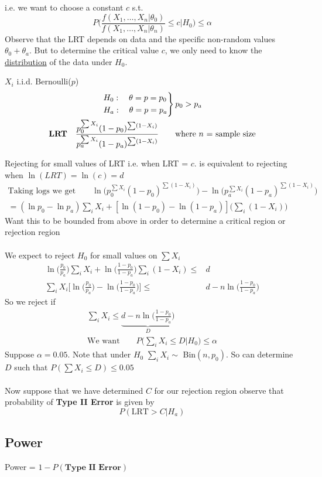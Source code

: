 i.e. we want to choose a constant $c$ s.t.
\begin{equation*}
	P\bigg( \frac{f(X_1, \ldots, X_n | \theta_0)}{f(X_1, \ldots, X_n | \theta_n)} \leq c \bigg| H_0 \bigg) \leq \alpha
\end{equation*}
Observe that the LRT depends on data and the specific non-random values $\theta_0 + \theta_a$. But to determine the critical value $c$, we only need to know the \underline{distribution} of the data under $H_0$.
\begin{example} $X_i$ i.i.d. Bernoulli($p$)
\begin{gather*}
\begin{rcases}
	H_0: \quad \theta = p = p_0\\
	H_a: \quad \theta = p = p_a
\end{rcases} p_0 > p_a\\
\textbf{LRT} \quad \frac{p_0^{\sum X_i} (1-p_0)^{\sum (1 - X_i)}}{p_a^{\sum X_i} (1-p_a)^{\sum (1- X_i)}} \qquad \text{where $n$ = sample size}
\end{gather*}	
\end{example}
Rejecting for small values of LRT i.e. when LRT = $c$. is equivalent to rejecting when $\ln(LRT) = \ln (c) = d$
\begin{gather*}
	\text{Taking logs we get} \qquad \ln \bigg( p_0^{\sum X_i} (1-p_0)^{\sum (1 - X_i)} \bigg) - \ln \bigg( p_a^{\sum X_i} (1-p_a)^{\sum (1 - X_i)} \bigg)\\
	= (\ln p_0 - \ln p_a)\sum_i X_i  +  [\ln(1-p_0) - \ln (1-p_a)] \bigg(\sum_i(1-X_i)\bigg)
\end{gather*}
Want this to be bounded from above in order to determine a critical region or rejection region\\\\
We expect to reject $H_0$ for small values on $\sum X_i$
\begin{align*}
	\ln\bigg(\frac{p_0}{p_a}\bigg) \sum_i X_i + \ln\bigg(\frac{1-p_0}{1-p_a}\bigg) \sum_i (1 -  X_i) \leq & d\\
	\sum_i X_i \bigg[ \ln\bigg(\frac{p_0}{p_a}\bigg) - \ln\bigg(\frac{1-p_0}{1-p_a}\bigg) \bigg] \leq & d - n \ln\bigg(\frac{1-p_0}{1-p_a}\bigg)
\end{align*}
So we reject if
\begin{gather*}
	\sum_i X_i \leq \underbrace{d - n \ln\bigg(\frac{1-p_0}{1-p_a}\bigg)}_{D}\\
	\text{We want} \qquad P\bigg( \sum_i X_i \leq D | H_0\bigg) \leq \alpha
\end{gather*}
Suppose $\alpha = 0.05$. Note that under $H_0$ $\sum_i X_i \sim$ Bin$(n, p_0)$. So can determine $D$ such that $P(\sum X_i \leq D) \leq 0.05$\\\\
Now suppose that we have determined $C$ for our rejection region observe that probability of \textbf{Type II Error} is given by
\begin{equation*}
	P ( \text{LRT} > C | H_a )
\end{equation*}
\subsection*{Power}
\begin{center}
	Power = $1 - P(\textbf{Type II Error})$
\end{center}